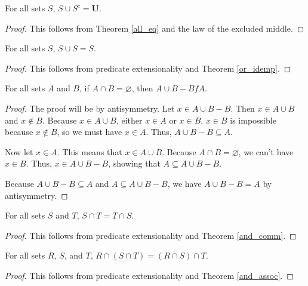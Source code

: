 \documentclass[../../math.tex]{subfiles}
\begin{document}
\begin{theorem} \label{union_compl_all}
    For all sets $S$, $S \cup S^c = \bm U$.
\end{theorem}
\begin{proof}
    This follows from Theorem \ref{all_eq} and the law of the excluded middle.
\end{proof}

\begin{theorem} \label{union_idemp}
    For all sets $S$, $S \cup S = S$.
\end{theorem}
\begin{proof}
    This follows from predicate extensionality and Theorem \ref{or_idemp}.
\end{proof}

\begin{theorem} \label{union_minus}
    For all sets $A$ and $B$, if $A \cap B = \varnothing$, then $A \cup B - B f
    A$.
\end{theorem}
\begin{proof}
    The proof will be by antisymmetry.  Let $x \in A \cup B - B$.  Then $x \in A
    \cup B$ and $x \notin B$.  Because $x \in A \cup B$, either $x \in A$ or $x
    \in B$.  $x \in B$ is impossible because $x \notin B$, so we must have $x \in
    A$.  Thus, $A \cup B - B \subseteq A$.

    Now let $x \in A$.  This means that $x \in A \cup B$.  Because $A \cap B =
    \varnothing$, we can't have $x \in B$.  Thus, $x \in A \cup B - B$, showing
    that $A \subseteq A \cup B - B$.

    Because $A \cup B - B \subseteq A$ and $A \subseteq A \cup B - B$, we have
    $A \cup B - B = A$ by antisymmetry.
\end{proof}

\begin{theorem} \label{inter_comm}
    For all sets $S$ and $T$, $S \cap T = T \cap S$.
\end{theorem}
\begin{proof}
    This follows from predicate extensionality and Theorem \ref{and_comm}.
\end{proof}

\begin{theorem} \label{inter_assoc}
    For all sets $R$, $S$, and $T$, $R \cap (S \cap T) = (R \cap S) \cap T$.
\end{theorem}
\begin{proof}
    This follows from predicate extensionality and Theorem \ref{and_assoc}.
\end{proof}
\end{document}
